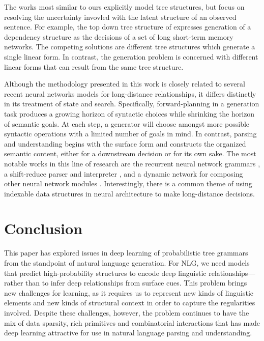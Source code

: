 \documentclass[11pt]{article}
\begin{document}
The works most similar to ours explicitly model tree structures, but focus on resolving the uncertainty invovled with the latent structure of an observed sentence. 
%
For example, the top down tree structure of  expresses generation of a dependency structure as the decisions of a set of long short-term memory networks.  
%
The competing solutions are different tree structures which generate a single linear form.
%
In contrast, the generation problem is concerned with different linear forms that can result from the same tree structure. 

Although the methodology presented in this work is closely related to several recent neural networks models for long-distance relationships, it differs distinctly in its treatment of state and search.
%
Specifically, forward-planning in a generation task produces a growing horizon of syntactic choices while shrinking the horizon of semantic goals.
%
At each step, a generator will choose amongst more possible syntactic operations with a limited number of goals in mind. 
%
In contrast, parsing and understanding begins with the surface form and constructs the organized semantic content, either for a downstream decision or for its own sake. 
%
The most notable works in this line of research are the recurrent neural network grammars \cite{dyer2016recurrent}, a shift-reduce parser and interpreter \cite{bowman2016fast}, and a dynamic network for composing other neural network modules \cite{Andreas2016LearningTC}. 
%
Interestingly, there is a common theme of using indexable data structures in neural architecture to make long-distance decisions. 

\section{Conclusion}
\label{sec:conclusion}

This paper has explored issues in deep learning of probabilistic tree
grammars from the standpoint of natural language generation.  
%
For NLG, we need models that predict high-probability structures to
encode deep linguistic relationships---rather than to infer deep
relationships from surface cues.
%
This problem brings new challenges for learning, as it requires us to
represent new kinds of linguistic elements and new kinds of structural
context in order to capture the regularities involved.
%
Despite these challenges, however, the problem continues to have the
mix of data sparsity, rich primitives and combinatorial
interactions that has made deep learning attractive for use in natural
language parsing and understanding.
\end{document}
